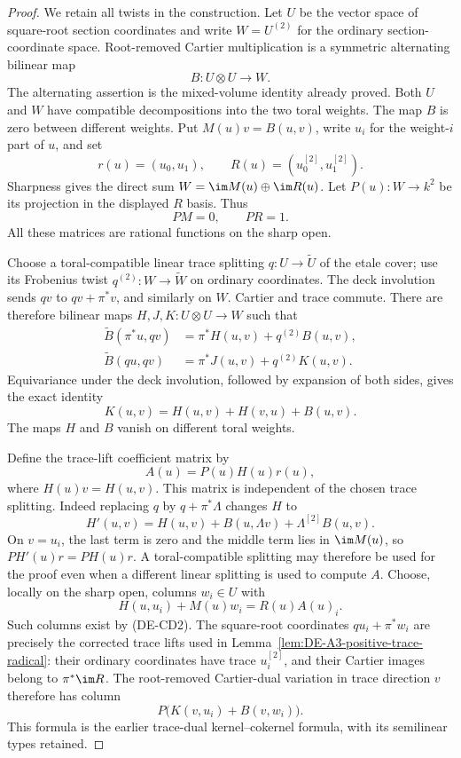 \begin{proof}
We retain all twists in the construction. Let $U$ be the vector space
of square-root section coordinates and write $W=U^{(2)}$ for the
ordinary section-coordinate space. Root-removed Cartier multiplication
is a symmetric alternating bilinear map
\[
             B:U\otimes U\longrightarrow W.
\]
The alternating assertion is the mixed-volume identity already proved.
Both $U$ and $W$ have compatible decompositions into the two toral
weights. The map $B$ is zero between different weights. Put
$M(u)v=B(u,v)$, write $u_i$ for the weight-$i$ part of $u$, and set
\[
 r(u)=(u_0,u_1),\qquad R(u)=(u_0^{[2]},u_1^{[2]}).
\]
Sharpness gives the direct sum $W=\im M(u)\oplus\im R(u)$.
Let $P(u):W\to k^2$ be its projection in the displayed $R$ basis.
Thus
\[
                       PM=0,\qquad PR=1.                \tag{DE-CD2}
\]
All these matrices are rational functions on the sharp open.

Choose a toral-compatible linear trace splitting
$q:U\to\widetilde U$ of the etale cover; use its Frobenius twist
$q^{(2)}:W\to\widetilde W$ on ordinary coordinates. The deck
involution sends $qv$ to $qv+\pi^*v$, and similarly on $W$.
Cartier and trace commute. There are therefore bilinear maps
$H,J,K:U\otimes U\to W$ such that
\[
 \begin{aligned}
 \widetilde B(\pi^*u,qv)&=\pi^*H(u,v)+q^{(2)}B(u,v),\\
 \widetilde B(qu,qv)&=\pi^*J(u,v)+q^{(2)}K(u,v).
 \end{aligned}
                                                        \tag{DE-CD3}
\]
Equivariance under the deck involution, followed by expansion of
both sides, gives the exact identity
\[
                  K(u,v)=H(u,v)+H(v,u)+B(u,v).            \tag{DE-CD4}
\]
The maps $H$ and $B$ vanish on different toral weights.

Define the trace-lift coefficient matrix by
\[
                          A(u)=P(u)H(u)r(u),
                                                        \tag{DE-CD5}
\]
where $H(u)v=H(u,v)$. This matrix is independent of the chosen trace
splitting. Indeed replacing $q$ by $q+\pi^*\Lambda$ changes $H$ to
\[
 H'(u,v)=H(u,v)+B(u,\Lambda v)+\Lambda^{[2]}B(u,v).
\]
On $v=u_i$, the last term is zero and the middle term lies in
$\im M(u)$, so $P H'(u)r=P H(u)r$. A toral-compatible splitting
may therefore be used for the proof even when a different linear
splitting is used to compute $A$.
Choose, locally on the sharp open, columns
$w_i\in U$ with
\[
                 H(u,u_i)+M(u)w_i=R(u)A(u)_i.            \tag{DE-CD6}
\]
Such columns exist by (DE-CD2). The square-root coordinates
$q u_i+\pi^*w_i$ are precisely the corrected trace lifts used in
Lemma~\ref{lem:DE-A3-positive-trace-radical}: their ordinary
coordinates have trace $u_i^{[2]}$, and their Cartier images belong
to $\pi^*\im R$. The root-removed Cartier-dual variation in trace direction $v$
therefore has column
\[
                  P\bigl(K(v,u_i)+B(v,w_i)\bigr).
                                                        \tag{DE-CD7}
\]
This formula is the earlier trace-dual kernel--cokernel formula,
with its semilinear types retained.


\end{proof}
